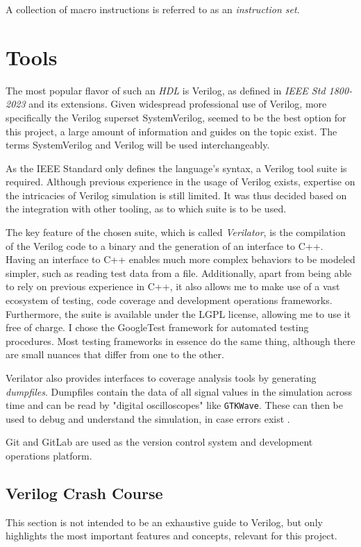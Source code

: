 A collection of macro instructions is referred to as an \textit{instruction set}. 

\section{Tools} \label{sec:tools}

The most popular flavor of such an \textit{HDL} is Verilog, as defined in \textit{IEEE Std 1800-2023} \cite{10458102} and its extensions. Given widespread professional use of Verilog, more specifically the Verilog superset SystemVerilog, seemed to be the best option for this project, a large amount of information and guides on the topic exist. The terms SystemVerilog and Verilog will be used interchangeably. 

As the IEEE Standard only defines the language's syntax, a Verilog tool suite is required. Although previous experience in the usage of Verilog exists, expertise on the intricacies of Verilog simulation is still limited. It was thus decided based on the integration with other tooling, as to which suite is to be used. 

The key feature of the chosen suite, which is called \textit{Verilator}, is the compilation of the Verilog code to a binary and the generation of an interface to C++. Having an interface to C++ enables much more complex behaviors to be modeled simpler, such as reading test data from a file. Additionally, apart from being able to rely on previous experience in C++, it also allows me to make use of a vast ecosystem of testing, code coverage and development operations frameworks. Furthermore, the suite is available under the LGPL license, allowing me to use it free of charge. I chose the GoogleTest framework for automated testing procedures. Most testing frameworks in essence do the same thing, although there are small nuances that differ from one to the other. 

Verilator also provides interfaces to coverage analysis tools by generating \textit{dumpfiles}. Dumpfiles contain the data of all signal values in the simulation across time and can be read by "digital oscilloscopes" like \texttt{GTKWave}. These can then be used to debug and understand the simulation, in case errors exist \cite{verilatoroverview}.

Git and GitLab are used as the version control system and development operations platform.

\subsection{Verilog Crash Course}
This section is not intended to be an exhaustive guide to Verilog, but only highlights the most important features and concepts, relevant for this project.

